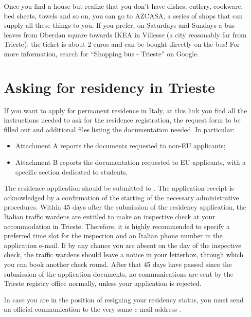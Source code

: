 \documentclass{sissavademecum}
\begin{document}
Once you find a house but realize that you don't have dishes, cutlery, cookware, bed sheets, towels and so on, you can go to AZCASA, a series of shops that can supply all these things to you. If you prefer, on Saturdays and Sundays a bus leaves from Oberdan square towards IKEA in Villesse (a city reasonably far from Trieste): the ticket is about 2 euros and can be bought directly on the bus! For more information, search for ``Shopping bus - Trieste'' on Google.


\section{Asking for residency in Trieste}

If you want to apply for permanent residence in Italy, at \href{https://www.comune.trieste.it/it/servizi-9173/anagrafe-stato-civile-9317/anagrafe-iscrizione-per-residenza-9360}{this} link you find all the instructions needed to ask for the residence registration, the request form to be filled out and additional files listing the documentation needed. In particular:
\begin{itemize}
	\item Attachment A reports the documents requested to non-EU applicants;
	\item Attachment B reports the documentation requested to EU applicants, with a specific section dedicated to students.
\end{itemize}

The residence application should be submitted to . The application receipt is acknowledged by a confirmation of the starting of the necessary administrative procedures. Within 45 days after the submission of the residency application, the Italian traffic wardens are entitled to make an inspective check at your accommodation in Trieste. Therefore, it is highly recommended to specify a preferred time slot for the inspection and an Italian phone number in the application e-mail. If by any chance you are absent on the day of the inspective check, the traffic wardens should leave a notice in your letterbox, through which you can book another check round. After that 45 days have passed since the submission of the application documents, no communications are sent by the Trieste registry office normally, unless your application is rejected.

In case you are in the position of resigning your residency status, you must send an official communication to the very same e-mail address .
\end{document}
